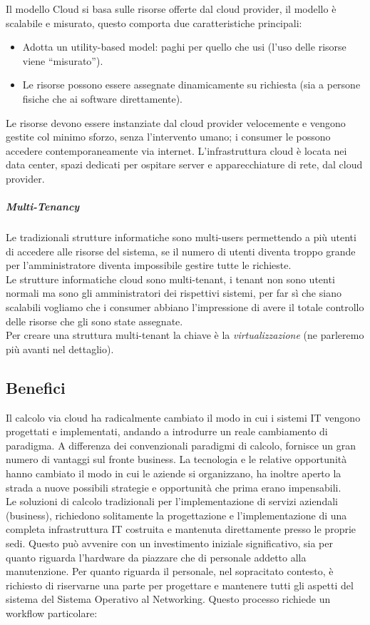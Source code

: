 \documentclass{article}
\begin{document}
Il modello Cloud si basa sulle risorse offerte dal cloud provider, il modello è scalabile e misurato, questo comporta due caratteristiche principali:
\begin{itemize}
    \item Adotta un utility-based model: paghi per quello che usi (l’uso delle risorse viene “misurato”).
    \item Le risorse possono essere assegnate dinamicamente su richiesta (sia a persone fisiche che ai software direttamente).
\end{itemize}
Le risorse devono essere instanziate dal cloud provider velocemente e vengono gestite col minimo sforzo, senza l’intervento umano; i consumer le possono accedere contemporaneamente via internet. L’infrastruttura cloud è locata nei data center, spazi dedicati per ospitare server e apparecchiature di rete, dal cloud provider.

\subparagraph{Multi-Tenancy}
Le tradizionali strutture informatiche sono multi-users permettendo a più utenti di accedere alle risorse del sistema, se il numero di utenti diventa troppo grande per l’amministratore diventa impossibile gestire tutte le richieste.\\
Le strutture informatiche cloud sono multi-tenant, i tenant non sono utenti normali ma sono gli amministratori dei rispettivi sistemi, per far sì che siano scalabili vogliamo che i consumer abbiano l’impressione di avere il totale controllo delle risorse che gli sono state assegnate.\\
Per creare una struttura multi-tenant la chiave è la \textit{virtualizzazione} (ne parleremo più avanti nel dettaglio).

\newpage
\subsection{Benefici}
Il calcolo via cloud ha radicalmente cambiato il modo in cui i sistemi IT vengono progettati e implementati, andando a introdurre un reale cambiamento di paradigma. A differenza dei convenzionali paradigmi di calcolo, fornisce un gran numero di vantaggi sul fronte business. La tecnologia e le relative opportunità hanno cambiato il modo in cui le aziende si organizzano, ha inoltre aperto la strada a nuove possibili strategie e opportunità che prima erano impensabili.\\
Le soluzioni di calcolo tradizionali per l’implementazione di servizi aziendali (business), richiedono solitamente la progettazione e l’implementazione di una completa infrastruttura IT costruita e mantenuta direttamente presso le proprie sedi. Questo può avvenire con un investimento iniziale significativo, sia per quanto riguarda l’hardware da piazzare che di personale addetto alla manutenzione. Per quanto riguarda il personale, nel sopracitato contesto, è richiesto di riservarne una parte per progettare e mantenere tutti gli aspetti del sistema del Sistema Operativo al Networking. Questo processo richiede un workflow particolare:\\
\end{document}

